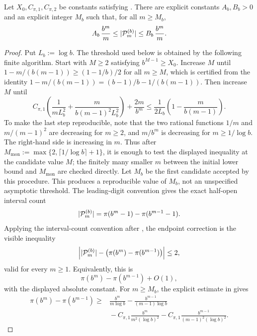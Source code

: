 \begin{lemma}
  \label{lem:base-prime-count}
  Let \(X_0,C_{\pi,1},C_{\pi,2}\) be constants satisfying
  . There are explicit constants
  \(A_b,B_b>0\) and an explicit integer \(M_b\) such that, for all
  \(m\ge M_b\),
  \[
    A_b\,\frac{b^m}{m}
    \le \lvert \mathcal P_m^{(b)} \rvert
    \le B_b\,\frac{b^m}{m}.
  \]
\end{lemma}

\begin{proof}
  Put \(L_b:=\log b\). The threshold used below is obtained by the
  following finite algorithm. Start with
  \(M\ge2\) satisfying \(b^{M-1}\ge X_0\). Increase \(M\) until
  \(1-m/(b(m-1))\ge(1-1/b)/2\) for all \(m\ge M\), which is certified
  from the identity
  \(1-m/(b(m-1))=(b-1)/b-1/(b(m-1))\). Then increase \(M\) until
  \[
    C_{\pi,1}\left(\frac{1}{mL_b^2}
      +\frac{m}{b(m-1)^2L_b^2}\right)
      +\frac{2m}{b^m}
    \le
    \frac{1}{2L_b}
      \left(1-\frac{m}{b(m-1)}\right).
  \]
  To make the last step reproducible, note that the two rational
  functions \(1/m\) and \(m/(m-1)^2\) are decreasing for \(m\ge2\), and
  \(m/b^m\) is decreasing for \(m\ge1/\log b\). The right-hand side is
  increasing in \(m\). Thus after
  \(M_{\mathrm{mon}}:=\max\{2,\lceil1/\log b\rceil+1\}\), it is enough
  to test the displayed inequality at the candidate value \(M\); the
  finitely many smaller \(m\) between the initial lower bound and
  \(M_{\mathrm{mon}}\) are checked directly. Let \(M_b\) be the first
  candidate accepted by this procedure. This produces a reproducible
  value of \(M_b\), not an unspecified asymptotic threshold.
  The leading-digit convention gives the exact half-open interval count
  \[
    \lvert \mathcal P_m^{(b)} \rvert=\pi(b^m-1)-\pi(b^{m-1}-1).
  \]
  Applying the interval-count convention after
  , the endpoint correction is the visible
  inequality
  \[
    \left|
      \lvert \mathcal P_m^{(b)} \rvert-
      \bigl(\pi(b^m)-\pi(b^{m-1})\bigr)
    \right|\le 2,
  \]
  valid for every \(m\ge1\). Equivalently, this is
  \[
    \pi(b^m)-\pi(b^{m-1})+O(1),
  \]
  with the displayed absolute constant. For \(m\ge M_b\), the explicit
  estimate in  gives
  \[
    \begin{aligned}
    \pi(b^m)-\pi(b^{m-1})
    \ge
    &\frac{b^m}{m\log b}
      -\frac{b^{m-1}}{(m-1)\log b}\\
    &{}-C_{\pi,1}\frac{b^m}{m^2(\log b)^2}
      -C_{\pi,1}\frac{b^{m-1}}{(m-1)^2(\log b)^2}.

\end{aligned}\]
\end{proof}
